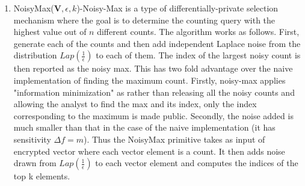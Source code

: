 {\begin{enumerate}
	\item \textsf{NoisyMax}($\mathbf{V},\epsilon, k$)-Noisy-Max is a type of differentially-private selection mechanism where the goal is to determine the counting query with the highest value out of $n$ different counts.  
	The algorithm works as follows. First, generate each of the counts and then add independent Laplace noise from the distribution $Lap(\frac{1}{\epsilon})$ to each of them. The index of the largest noisy count is then reported as the noisy max.
	This has two fold advantage over the naive implementation of finding the maximum count.
Firstly, noisy-max applies "information minimization" as rather than releasing all the noisy counts
and allowing the analyst to find the max and its index, only the
index corresponding to the maximum is made public.
Secondly, the noise added is much smaller than that in the case of the naive implementation (it has sensitivity $\Delta f=m$). Thus the \textsf{NoisyMax} primitive takes as input of encrypted vector where each vector element is a count. It then adds noise drawn from $Lap(\frac{1}{\epsilon})$ to each vector element and computes the indices of the top k elements.
\end{enumerate}
}
